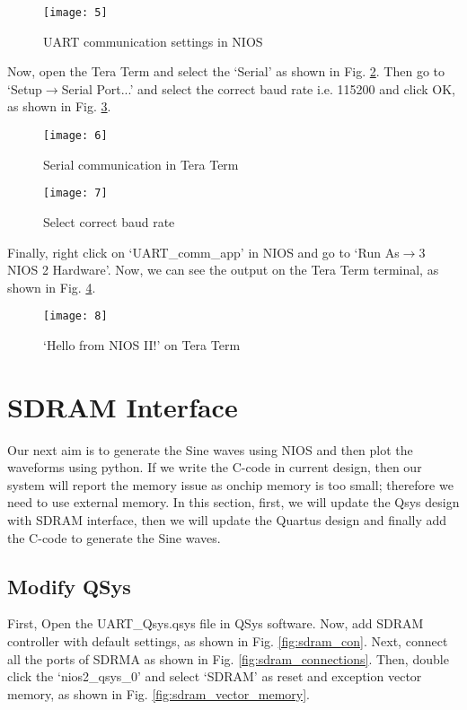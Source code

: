 \begin{figure}[!h]
	\centering
	\texttt{[image: 5]}
	\caption{UART communication settings in NIOS}
	\label{fig:nios_uart_settings}
\end{figure}

Now, open the Tera Term and select the `Serial' as shown in Fig. \ref{fig:teraTerm}. Then go to `Setup$\rightarrow$Serial Port...' and select the correct baud rate i.e. 115200 and click OK, as shown in Fig. \ref{fig:baudRateteraTerm}. 

\begin{figure}[!h]
	\centering
	\texttt{[image: 6]}
	\caption{Serial communication in Tera Term}
	\label{fig:teraTerm}
\end{figure}

\begin{figure}[!h]
	\centering
	\texttt{[image: 7]}
	\caption{Select correct baud rate}
	\label{fig:baudRateteraTerm}
\end{figure}

Finally, right click on `UART\_comm\_app' in NIOS and go to `Run As$\rightarrow$3 NIOS 2 Hardware'. Now, we can see the output on the Tera Term terminal, as shown in Fig. \ref{fig:helloTera}. 

\begin{figure}[!h]
	\centering
	\texttt{[image: 8]}
	\caption{`Hello from NIOS II!' on Tera Term}
	\label{fig:helloTera}
\end{figure}

\section{SDRAM Interface}
Our next aim is to generate the Sine waves using NIOS and then plot the waveforms using python. If we write the C-code in current design, then our system will report the memory issue as onchip memory is too small; therefore we need to use external memory. In this section, first, we will update the Qsys design with SDRAM interface, then we will update the Quartus design and finally add the C-code to generate the Sine waves. 

\subsection{Modify QSys}
First, Open the UART\_Qsys.qsys file in QSys software. Now, add SDRAM controller with default settings,  as shown in Fig. \ref{fig:sdram_con}. Next, connect all the ports of SDRMA as shown in Fig. \ref{fig:sdram_connections}. Then, double click the `nios2\_qsys\_0' and select `SDRAM' as reset and exception vector memory, as shown in Fig. \ref{fig:sdram_vector_memory}. 

